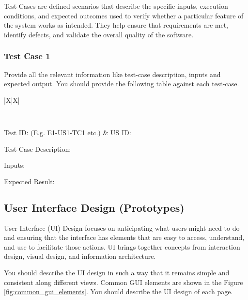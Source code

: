 Test Cases are defined scenarios that describe the specific inputs, execution conditions, and expected outcomes used to verify whether a particular feature of the system works as intended. They help ensure that requirements are met, identify defects, and validate the overall quality of the software.

\subsubsection{Test Case 1}

Provide all the relevant information like test-case description, inputs and expected output. You should provide the following table against each test-case.

{
\setModernTableStyle
\begin{xltabular}{\textwidth}{|X|X|}

    \hiderowcolors
    \caption{Test Case 1} \label{tab:test_case_ch2_1} \\
    \hline
    \showrowcolors

    Test ID: (E.g. E1-US1-TC1 etc.) & US ID: \\ \hline

    {Test Case Description: } \\ \hline

    {Inputs:} \\ \hline

    {Expected Result:} \\ \hline

\end{xltabular}
}

\subsection{User Interface Design (Prototypes)}

User Interface (UI) Design focuses on anticipating what users might need to do and ensuring that the interface has elements that are easy to access, understand, and use to facilitate those actions. UI brings together concepts from interaction design, visual design, and information architecture.

You should describe the UI design in such a way that it remains simple and consistent along different views. Common GUI elements are shown in the Figure \ref{fig:common_gui_elements}. You should describe the UI design of each page.

